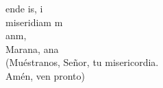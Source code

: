 \begin{cancion}%
	ende is, i\\
	miseridiam m\\
	anm,\\
	Marana, ana\\
(Muéstranos, Señor, tu misericordia.\\
 Amén, ven pronto)\\
\end{cancion}%

